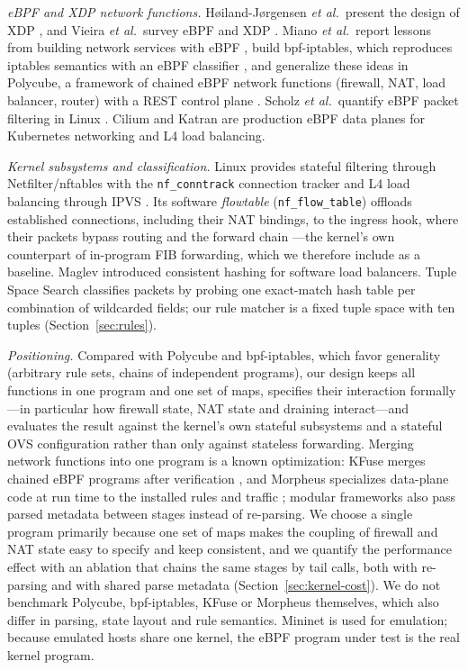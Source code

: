 \documentclass[conference]{IEEEtran}
\begin{document}
\textit{eBPF and XDP network functions.} H{\o}iland-J{\o}rgensen
\textit{et al.}\ present the design of XDP \cite{hoiland2018xdp}, and Vieira
\textit{et al.}\ survey eBPF and XDP \cite{vieira2020ebpf}. Miano
\textit{et al.}\ report lessons from building network services with eBPF
\cite{miano2018creating}, build bpf-iptables, which reproduces iptables
semantics with an eBPF classifier \cite{miano2019bpfiptables}, and generalize
these ideas in Polycube, a framework of chained eBPF network functions
(firewall, NAT, load balancer, router) with a REST control plane
\cite{miano2021polycube}. Scholz \textit{et al.}\ quantify eBPF packet
filtering in Linux \cite{scholz2018filtering}. Cilium \cite{cilium} and Katran
\cite{katran} are production eBPF data planes for Kubernetes networking and L4
load balancing.

\textit{Kernel subsystems and classification.} Linux provides stateful
filtering through Netfilter/nftables with the \texttt{nf\_conntrack}
connection tracker \cite{nftables} and L4 load balancing through IPVS
\cite{zhang2000lvs}. Its software \emph{flowtable} (\texttt{nf\_flow\_table})
offloads established connections, including their NAT bindings, to the
ingress hook, where their packets bypass routing and the forward chain
\cite{nfflowtable}---the kernel's own counterpart of in-program FIB
forwarding, which we therefore include as a baseline. Maglev \cite{eisenbud2016maglev} introduced consistent
hashing for software load balancers. Tuple Space Search
\cite{srinivasan1999tss} classifies packets by probing one exact-match hash
table per combination of wildcarded fields; our rule matcher is a fixed tuple
space with ten tuples (Section~\ref{sec:rules}).

\textit{Positioning.} Compared with Polycube and bpf-iptables, which favor
generality (arbitrary rule sets, chains of independent programs), our design
keeps all functions in one program and one set of maps, specifies their
interaction formally---in particular how firewall state, NAT state and
draining interact---and evaluates the result against the kernel's own
stateful subsystems and a stateful OVS configuration rather than only against
stateless forwarding. Merging network functions into one program is a
known optimization: KFuse merges chained eBPF programs after verification
\cite{kuo2022kfuse}, and Morpheus specializes data-plane code at run time to
the installed rules and traffic \cite{miano2022morpheus}; modular frameworks
also pass parsed metadata between stages instead of re-parsing. We choose a
single program primarily because one set of maps makes the coupling of
firewall and NAT state easy to specify and keep consistent, and we quantify
the performance effect with an ablation that chains the same stages by tail
calls, both with re-parsing and with shared parse metadata
(Section~\ref{sec:kernel-cost}). We do not benchmark Polycube, bpf-iptables,
KFuse or Morpheus themselves, which also differ in parsing, state layout and
rule semantics. Mininet \cite{lantz2010mininet} is used for emulation;
because emulated hosts share one kernel, the eBPF program under test is the
real kernel program.
\end{document}
